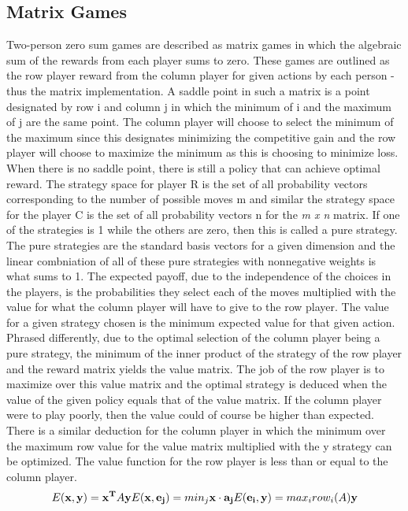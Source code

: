 \documentclass[12pt]{article}
\begin{document}
\subsection{Matrix Games}
Two-person zero sum games are described as matrix games in which the algebraic sum of the rewards from each player sums to zero. These games are outlined as the row player reward from the 
column player for given actions by each person - thus the matrix implementation. A saddle point in such a matrix is a point designated by row i and column j in which the minimum of i 
and the maximum of j are the same point. The column player will choose to select the minimum of the maximum since this designates minimizing the competitive gain and the row player 
will choose to maximize the minimum as this is choosing to minimize loss. When there is no saddle point, there is still a policy that can achieve optimal reward. The strategy space 
for player R is the set of all probability vectors corresponding to the number of possible moves m and similar the strategy space for the player C is the set of all probability 
vectors n for the \textit{m x n} matrix. If one of the strategies is 1 while the others are zero, then this is called a pure strategy. The pure strategies are the standard basis 
vectors for a given dimension and the linear combniation of all of these pure strategies with nonnegative weights is what sums to 1. The expected payoff, due to the independence 
of the choices in the players, is the probabilities they select each of the moves multiplied with the value for what the column player will have to give to the row player. The 
value for a given strategy chosen is the minimum expected value for that given action. Phrased differently, due to the optimal selection of the column player being a pure strategy, 
the minimum of the inner product of the strategy of the row player and the reward matrix yields the value matrix. The job of the row player is to maximize over this value matrix 
and the optimal strategy is deduced when the value of the given policy equals that of the value matrix. If the column player were to play poorly, then the value could of course be 
higher than expected. There is a similar deduction for the column player in which the minimum over the maximum row value for the value matrix multiplied with the y strategy can 
be optimized. The value function for the row player is less than or equal to the column player. 
\newline
$$
E(\mathbf{x},\mathbf{y})=\mathbf{x^T}A\mathbf{y} \\
E(\mathbf{x, e_j})=min_j\mathbf{x\cdot a_j} \\
E(\mathbf{e_i, y})=max_irow_i(A)\mathbf{y}
$$
\end{document}
